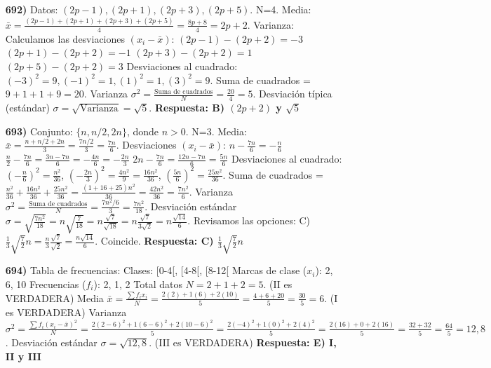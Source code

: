 \documentclass[12pt, a4paper]{article} %
\begin{document}
\begin{enumerate}
    \item[\bfseries 692)] Datos: $(2p - 1), (2p + 1), (2p + 3), (2p + 5)$. N=4.
    Media: $\bar{x} = \frac{(2p-1) + (2p+1) + (2p+3) + (2p+5)}{4} = \frac{8p + 8}{4} = 2p + 2$.
    Varianza: Calculamos las desviaciones $(x_i - \bar{x})$:
    $(2p-1) - (2p+2) = -3$
    $(2p+1) - (2p+2) = -1$
    $(2p+3) - (2p+2) = 1$
    $(2p+5) - (2p+2) = 3$
    Desviaciones al cuadrado: $(-3)^2=9, (-1)^2=1, (1)^2=1, (3)^2=9$.
    Suma de cuadrados = $9 + 1 + 1 + 9 = 20$.
    Varianza $\sigma^2 = \frac{\text{Suma de cuadrados}}{N} = \frac{20}{4} = 5$.
    Desviación típica (estándar) $\sigma = \sqrt{\text{Varianza}} = \sqrt{5}$.
    \textbf{Respuesta: B) $(2p + 2)$ y $\sqrt{5}$}

    \item[\bfseries 693)] Conjunto: $\{n, n/2, 2n\}$, donde $n>0$. N=3.
    Media: $\bar{x} = \frac{n + n/2 + 2n}{3} = \frac{7n/2}{3} = \frac{7n}{6}$.
    Desviaciones $(x_i - \bar{x})$:
    $n - \frac{7n}{6} = -\frac{n}{6}$
    $\frac{n}{2} - \frac{7n}{6} = \frac{3n-7n}{6} = -\frac{4n}{6} = -\frac{2n}{3}$
    $2n - \frac{7n}{6} = \frac{12n-7n}{6} = \frac{5n}{6}$
    Desviaciones al cuadrado: $(-\frac{n}{6})^2 = \frac{n^2}{36}$, $(-\frac{2n}{3})^2 = \frac{4n^2}{9} = \frac{16n^2}{36}$, $(\frac{5n}{6})^2 = \frac{25n^2}{36}$.
    Suma de cuadrados = $\frac{n^2}{36} + \frac{16n^2}{36} + \frac{25n^2}{36} = \frac{(1+16+25)n^2}{36} = \frac{42n^2}{36} = \frac{7n^2}{6}$.
    Varianza $\sigma^2 = \frac{\text{Suma de cuadrados}}{N} = \frac{7n^2/6}{3} = \frac{7n^2}{18}$.
    Desviación estándar $\sigma = \sqrt{\frac{7n^2}{18}} = n \sqrt{\frac{7}{18}} = n \frac{\sqrt{7}}{\sqrt{18}} = n \frac{\sqrt{7}}{3\sqrt{2}} = n \frac{\sqrt{14}}{6}$.
    Revisamos las opciones:
    C) $\frac{1}{3}\sqrt{\frac{7}{2}}n = \frac{n}{3} \frac{\sqrt{7}}{\sqrt{2}} = \frac{n\sqrt{14}}{6}$. Coincide.
    \textbf{Respuesta: C) $\frac{1}{3}\sqrt{\frac{7}{2}}n$}

    \item[\bfseries 694)] Tabla de frecuencias:
    Clases: [0-4[, [4-8[, [8-12[
    Marcas de clase ($x_i$): 2, 6, 10
    Frecuencias ($f_i$): 2, 1, 2
    Total datos $N = 2+1+2 = 5$. (II es VERDADERA)
    Media $\bar{x} = \frac{\sum f_i x_i}{N} = \frac{2(2)+1(6)+2(10)}{5} = \frac{4+6+20}{5} = \frac{30}{5} = 6$. (I es VERDADERA)
    Varianza $\sigma^2 = \frac{\sum f_i (x_i - \bar{x})^2}{N} = \frac{2(2-6)^2 + 1(6-6)^2 + 2(10-6)^2}{5} = \frac{2(-4)^2 + 1(0)^2 + 2(4)^2}{5} = \frac{2(16) + 0 + 2(16)}{5} = \frac{32+32}{5} = \frac{64}{5} = 12,8$.
    Desviación estándar $\sigma = \sqrt{12,8}$. (III es VERDADERA)
    \textbf{Respuesta: E) I, II y III}


\end{enumerate}
\end{document}
